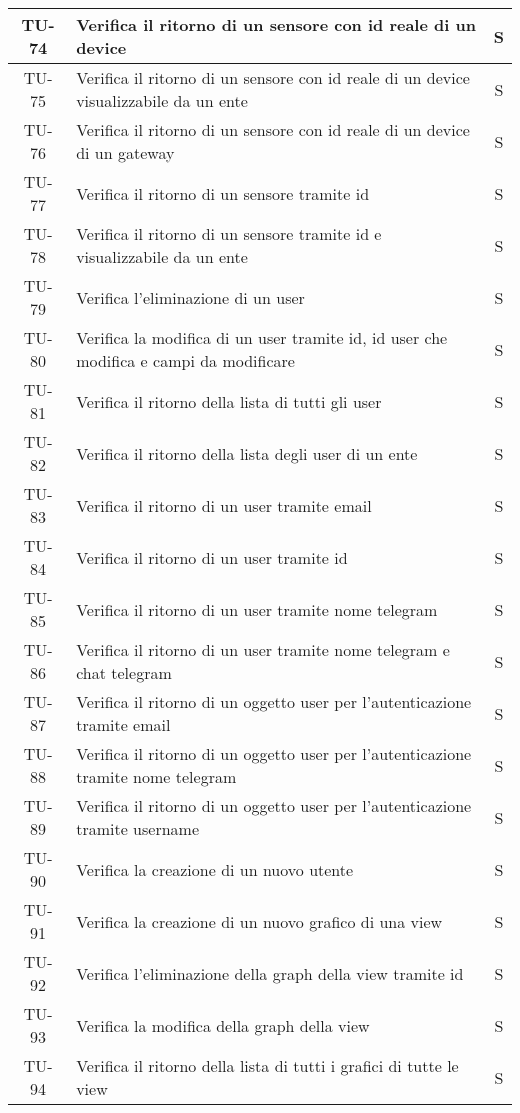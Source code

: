 \begin{center}
\begin{longtable}{|c|p{12cm}|c|}
			\hline
			TU-74 & Verifica il ritorno di un sensore con id reale di un device & S \\
			\hline
			TU-75 & Verifica il ritorno di un sensore con id reale di un device visualizzabile da un ente & S \\
			\hline
			TU-76 & Verifica il ritorno di un sensore con id reale di un device di un gateway & S \\
			\hline
			TU-77 & Verifica il ritorno di un sensore tramite id & S \\
			\hline
			TU-78 & Verifica il ritorno di un sensore tramite id e visualizzabile da un ente & S \\
			\hline
			TU-79 & Verifica l'eliminazione di un user & S \\
			\hline
			TU-80 & Verifica la modifica di un user tramite id, id user che modifica e campi da modificare & S \\
			\hline
			TU-81 & Verifica il ritorno della lista di tutti gli user & S \\
			\hline
			TU-82 & Verifica il ritorno della lista degli user di un ente & S \\
			\hline
			TU-83 & Verifica il ritorno di un user tramite email & S \\
			\hline
			TU-84 & Verifica il ritorno di un user tramite id & S \\
			\hline
			TU-85 & Verifica il ritorno di un user tramite nome telegram & S \\
			\hline
			TU-86 & Verifica il ritorno di un user tramite nome telegram e chat telegram & S \\
			\hline
			TU-87 & Verifica il ritorno di un oggetto user per l'autenticazione tramite email & S \\
			\hline
			TU-88 & Verifica il ritorno di un oggetto user per l'autenticazione tramite nome telegram & S \\
			\hline
			TU-89 & Verifica il ritorno di un oggetto user per l'autenticazione tramite username & S \\
			\hline
			TU-90 & Verifica la creazione di un nuovo utente & S \\
			\hline
			TU-91 & Verifica la creazione di un nuovo grafico di una view & S \\
			\hline
			TU-92 & Verifica l'eliminazione della graph della view tramite id & S \\
			\hline
			TU-93 & Verifica la modifica della graph della view & S \\
			\hline
			TU-94 & Verifica il ritorno della lista di tutti i grafici di tutte le view & S \\

\end{longtable}
\end{center}
